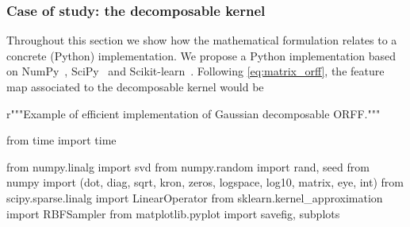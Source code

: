 \documentclass[twoside,11pt]{article}
\begin{document}
\subsubsection{Case of study: the decomposable kernel}
\label{subsec:fast_decomposable}
Throughout this section we show how the mathematical formulation relates to a
concrete (Python) implementation. We propose a Python implementation based on
NumPy~\citep{oliphant2006guide}, SciPy~\citep{jones2014scipy} and
Scikit-learn~\citep{pedregosa2011scikit}. Following \cref{eq:matrix_orff}, the
feature map associated to the decomposable kernel would be
\begin{pycode}
r"""Example of efficient implementation of Gaussian decomposable ORFF."""

from time import time

from numpy.linalg import svd
from numpy.random import rand, seed
from numpy import (dot, diag, sqrt, kron, zeros,
                   logspace, log10, matrix, eye, int)
from scipy.sparse.linalg import LinearOperator
from sklearn.kernel_approximation import RBFSampler
from matplotlib.pyplot import savefig, subplots
\end{pycode}
\end{document}
